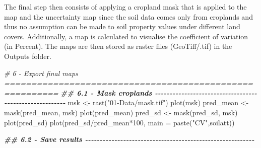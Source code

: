 \documentclass[
  10pt,
  b5paper,
  oneside]{book}
\newenvironment{Shaded}{\begin{snugshade}}{\end{snugshade}}
\newcommand{\AttributeTok}[1]{\textcolor[rgb]{0.77,0.63,0.00}{#1}}
\newcommand{\CommentTok}[1]{\textcolor[rgb]{0.56,0.35,0.01}{\textit{#1}}}
\newcommand{\DecValTok}[1]{\textcolor[rgb]{0.00,0.00,0.81}{#1}}
\newcommand{\DocumentationTok}[1]{\textcolor[rgb]{0.56,0.35,0.01}{\textbf{\textit{#1}}}}
\newcommand{\FunctionTok}[1]{\textcolor[rgb]{0.00,0.00,0.00}{#1}}
\newcommand{\NormalTok}[1]{#1}
\newcommand{\OtherTok}[1]{\textcolor[rgb]{0.56,0.35,0.01}{#1}}
\newcommand{\SpecialCharTok}[1]{\textcolor[rgb]{0.00,0.00,0.00}{#1}}
\newcommand{\StringTok}[1]{\textcolor[rgb]{0.31,0.60,0.02}{#1}}
\begin{document}
The final step then consists of applying a cropland mask that is applied to the map and the uncertainty map since the soil data comes only from croplands and thus no assumption can be made to soil property values under different land covers. Additionally, a map is calculated to visualise the coefficient of variation (in Percent). The maps are then stored as raster files (GeoTiff/.tif) in the Outputs folder.

\begin{Shaded}
\begin{Highlighting}[]
\CommentTok{\# 6 {-} Export final maps ========================================================}
\DocumentationTok{\#\# 6.1 {-} Mask croplands {-}{-}{-}{-}{-}{-}{-}{-}{-}{-}{-}{-}{-}{-}{-}{-}{-}{-}{-}{-}{-}{-}{-}{-}{-}{-}{-}{-}{-}{-}{-}{-}{-}{-}{-}{-}{-}{-}{-}{-}{-}{-}{-}{-}{-}{-}{-}{-}{-}{-}{-}{-}{-}{-}{-}{-}}
\NormalTok{msk }\OtherTok{\textless{}{-}} \FunctionTok{rast}\NormalTok{(}\StringTok{"01{-}Data/mask.tif"}\NormalTok{)}
\FunctionTok{plot}\NormalTok{(msk)}
\NormalTok{pred\_mean }\OtherTok{\textless{}{-}} \FunctionTok{mask}\NormalTok{(pred\_mean, msk)}
\FunctionTok{plot}\NormalTok{(pred\_mean)}
\NormalTok{pred\_sd }\OtherTok{\textless{}{-}} \FunctionTok{mask}\NormalTok{(pred\_sd, msk)}
\FunctionTok{plot}\NormalTok{(pred\_sd)}
\FunctionTok{plot}\NormalTok{(pred\_sd}\SpecialCharTok{/}\NormalTok{pred\_mean}\SpecialCharTok{*}\DecValTok{100}\NormalTok{, }\AttributeTok{main =} \FunctionTok{paste}\NormalTok{(}\StringTok{"CV"}\NormalTok{,soilatt))}

\DocumentationTok{\#\# 6.2 {-} Save results {-}{-}{-}{-}{-}{-}{-}{-}{-}{-}{-}{-}{-}{-}{-}{-}{-}{-}{-}{-}{-}{-}{-}{-}{-}{-}{-}{-}{-}{-}{-}{-}{-}{-}{-}{-}{-}{-}{-}{-}{-}{-}{-}{-}{-}{-}{-}{-}{-}{-}{-}{-}{-}{-}{-}{-}{-}{-}}


\end{Highlighting}
\end{Shaded}
\end{document}
